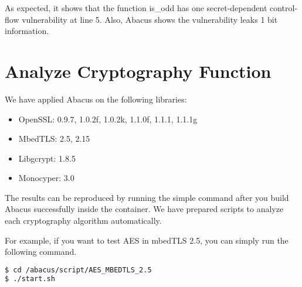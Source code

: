 \documentclass[10pt,conference]{IEEEtran}
\newcommand{\tool}{\textsf{Abacus}}
\begin{document}
As expected, it shows that the function \textsf{is\_odd} has one secret-dependent control-flow vulnerability at line 5. Also, Abacus shows the vulnerability leaks 1 bit information.

\section{Analyze Cryptography Function}
We have applied \tool{} on the following libraries:
\begin{itemize}
\item OpenSSL: 0.9.7, 1.0.2f, 1.0.2k, 1.1.0f, 1.1.1, 1.1.1g
\item MbedTLS: 2.5, 2.15
\item Libgcrypt: 1.8.5
\item Monocyper: 3.0
\end{itemize}

The results can be reproduced by running the simple command after you build \tool{} successfully inside the container. We have prepared scripts to analyze each cryptography algorithm automatically.

For example, if you want to test AES in mbedTLS 2.5, you can simply run the 
following command.

\begin{lstlisting}[language=bash]
$ cd /abacus/script/AES_MBEDTLS_2.5
$ ./start.sh
\end{lstlisting}
\end{document}
